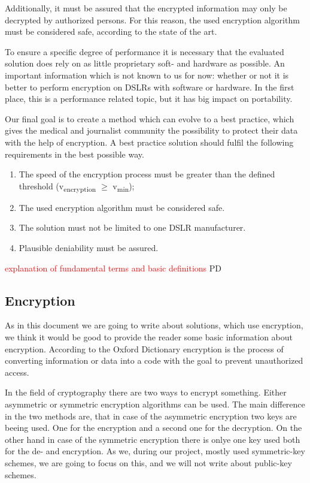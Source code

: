 \documentclass[12pt,a4paper,titlepage,oneside]{scrartcl}
\newcommand\todo[1]{\textcolor{red}{#1}}
\begin{document}
Additionally, it must be assured that the encrypted information may only be decrypted by authorized persons.
For this reason, the used encryption algorithm must be considered safe, according to the state of the art.

To ensure a specific degree of performance it is necessary that the evaluated solution does rely on as little proprietary soft- and hardware as possible.
An important information which is not known to us for now: whether or not it is better to perform encryption on DSLRs with software or hardware.
In the first place, this is a performance related topic, but it has big impact on portability.



Our final goal is to create a method which can evolve to a best practice, which gives the medical and journalist community the possibility to protect their data with the help of encryption.
A best practice solution should fulfil the following requirements in the best possible way.
\begin{enumerate}
  \item The speed of the encryption process must be greater than the defined threshold (v\textsubscript{encryption} $\geq$ v\textsubscript{min});
  \item The used encryption algorithm must be considered safe.
  \item The solution must not be limited to one DSLR manufacturer.
  \item Plausible deniability must be assured.
\end{enumerate}

\todo{explanation of fundamental terms and basic definitions}
PD

\subsection{Encryption}
As in this document we are going to write about solutions, which use encryption, we think it would be good to provide the reader some basic information about encryption.
According to the Oxford Dictionary encryption is the process of converting information or data into a code with the goal to prevent unauthorized access. \cite{OxforddictEncrypt}

In the field of cryptography there are two ways to encrypt something.
Either asymmetric or symmetric encryption algorithms can be used.
The main difference in the two methods are, that in case of the asymmetric encryption two keys are beeing used.
One for the encryption and a second one for the decryption.
On the other hand in case of the symmetric encryption there is onlye one key used both for the de- and encryption.
As we, during our project, mostly used symmetric-key schemes, we are going to focus on this, and we will not write about public-key schemes.
\end{document}
